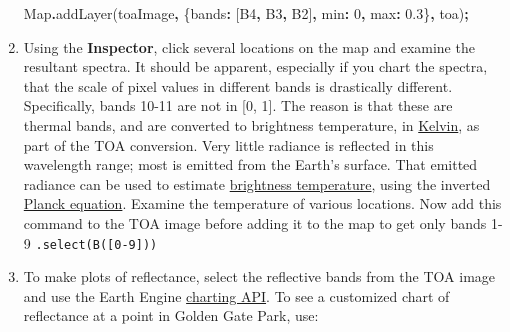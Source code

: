 \documentclass[
]{article}
\newenvironment{Shaded}{\begin{snugshade}}{\end{snugshade}}
\newcommand{\BuiltInTok}[1]{#1}
\newcommand{\DataTypeTok}[1]{\textcolor[rgb]{0.13,0.29,0.53}{#1}}
\newcommand{\DecValTok}[1]{\textcolor[rgb]{0.00,0.00,0.81}{#1}}
\newcommand{\FloatTok}[1]{\textcolor[rgb]{0.00,0.00,0.81}{#1}}
\newcommand{\FunctionTok}[1]{\textcolor[rgb]{0.00,0.00,0.00}{#1}}
\newcommand{\NormalTok}[1]{#1}
\newcommand{\OperatorTok}[1]{\textcolor[rgb]{0.81,0.36,0.00}{\textbf{#1}}}
\newcommand{\StringTok}[1]{\textcolor[rgb]{0.31,0.60,0.02}{#1}}
\begin{document}
\begin{enumerate}
\begin{Shaded}
\begin{Highlighting}[]
\BuiltInTok{Map}\OperatorTok{.}\FunctionTok{addLayer}\NormalTok{(toaImage}\OperatorTok{,}\NormalTok{ \{}\DataTypeTok{bands}\OperatorTok{:}\NormalTok{ [}\StringTok{\textquotesingle{}B4\textquotesingle{}}\OperatorTok{,} \StringTok{\textquotesingle{}B3\textquotesingle{}}\OperatorTok{,} \StringTok{\textquotesingle{}B2\textquotesingle{}}\NormalTok{]}\OperatorTok{,} \DataTypeTok{min}\OperatorTok{:} \DecValTok{0}\OperatorTok{,} \DataTypeTok{max}\OperatorTok{:} \FloatTok{0.3}\NormalTok{\}}\OperatorTok{,}  \StringTok{\textquotesingle{}toa\textquotesingle{}}\NormalTok{)}\OperatorTok{;}  
\end{Highlighting}
\end{Shaded}
\item
  Using the \textbf{Inspector}, click several locations on the map and examine the resultant spectra. It should be apparent, especially if you chart the spectra, that the scale of pixel values in different bands is drastically different. Specifically, bands 10-11 are not in {[}0, 1{]}. The reason is that these are thermal bands, and are converted to brightness temperature, in \href{https://en.wikipedia.org/wiki/Kelvin}{Kelvin}, as part of the TOA conversion. Very little radiance is reflected in this wavelength range; most is emitted from the Earth's surface. That emitted radiance can be used to estimate \href{https://en.wikipedia.org/wiki/Brightness_temperature}{brightness temperature}, using the inverted \href{https://en.wikipedia.org/wiki/Planck's_law}{Planck equation}. Examine the temperature of various locations. Now add this command to the TOA image before adding it to the map to get only bands 1-9 \texttt{.select(\textquotesingle{}B({[}0-9{]})\textquotesingle{})}
\item
  To make plots of reflectance, select the reflective bands from the TOA image and use the Earth Engine \href{https://developers.google.com/earth-engine/charts}{charting API}. To see a customized chart of reflectance at a point in Golden Gate Park, use:


\end{enumerate}
\end{document}
